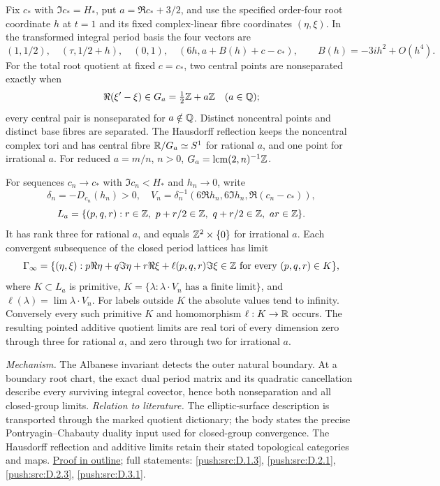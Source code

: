 \documentclass[11pt,a4paper]{article}
\theoremstyle{definition}
\begin{document}
Fix $c_*$ with $\Im c_*=H_*$, put $a=\Re c_*+3/2$, and use the
specified order-four root coordinate $h$ at $t=1$ and its fixed
complex-linear fibre coordinates $(\eta,\xi)$.  In the transformed
integral period basis the four vectors are
\[
 (1,1/2),\quad(\tau,1/2+h),\quad(0,1),
 \quad(6h,a+B(h)+c-c_*),
 \qquad B(h)=-3ih^2+O(h^4).
\]
For the total root quotient at fixed $c=c_*$, two central points
are nonseparated exactly when
\[
 \Re(\xi'-\xi)\in G_a=\tfrac12\mathbb Z+a\mathbb Z\quad(a\in\mathbb Q);
\]
every central pair is nonseparated for $a\notin\mathbb Q$.  Distinct
noncentral points and distinct base fibres are separated.
The Hausdorff reflection keeps the noncentral complex tori and
has central fibre $\mathbb R/G_a\simeq S^1$ for rational $a$, and one
point for irrational $a$.  For reduced $a=m/n$, $n>0$,
$G_a=\operatorname{lcm}(2,n)^{-1}\mathbb Z$.

For sequences $c_n\to c_*$ with $\Im c_n<H_*$ and $h_n\to0$,
write
\[
 \delta_n=-D_{c_n}(h_n)>0,\quad
 V_n=\delta_n^{-1}(6\Re h_n,6\Im h_n,\Re(c_n-c_*)),
\]
\[
 L_a=\{(p,q,r):r\in\mathbb Z,\ p+r/2\in\mathbb Z,
                      \ q+r/2\in\mathbb Z,\ ar\in\mathbb Z\}.
\]
It has rank three for rational $a$, and equals
$\mathbb Z^2\times\{0\}$ for irrational $a$.  Each convergent
subsequence of the closed period lattices has limit
\[
 \Gamma_\infty=\{(\eta,\xi):p\Re\eta+q\Im\eta+r\Re\xi
       +\ell(p,q,r)\Im\xi\in\mathbb Z\text{ for every }(p,q,r)\in K\},
\]
where $K\subset L_a$ is primitive,
$K=\{\lambda:\lambda\cdot V_n\text{ has a finite limit}\}$,
and $\ell(\lambda)=\lim\lambda\cdot V_n$.
For labels outside $K$ the absolute values tend to infinity.
Conversely every such primitive $K$ and homomorphism
$\ell:K\to\mathbb R$ occurs.  The resulting pointed additive quotient
limits are real tori of every dimension zero through three for
rational $a$, and zero through two for irrational $a$.

\textit{Mechanism.} The Albanese invariant detects the outer
natural boundary.  At a boundary root chart, the exact dual
period matrix and its quadratic cancellation describe every
surviving integral covector, hence both nonseparation and all
closed-group limits.
\textit{Relation to literature.} The elliptic-surface description
is transported through the marked quotient dictionary; the body
states the precise Pontryagin--Chabauty duality input used for
closed-group convergence.  The Hausdorff reflection and additive
limits retain their stated topological categories and maps.
\hyperlink{outline-I-G}{Proof in outline}; full statements:
\ref{push:src:D.1.3}, \ref{push:src:D.2.1},
\ref{push:src:D.2.3}, \ref{push:src:D.3.1}.
\end{document}
